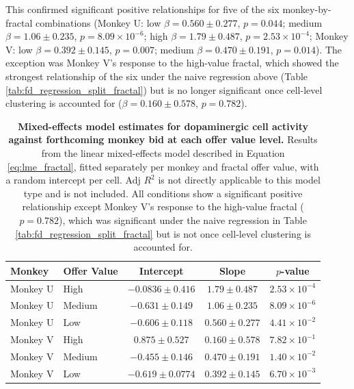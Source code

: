 This confirmed significant positive relationships for five of the six monkey-by-fractal combinations (Monkey U: low $\beta = 0.560 \pm 0.277$, $p = 0.044$; medium $\beta = 1.06 \pm 0.235$, $p = 8.09 \times 10^{-6}$; high $\beta = 1.79 \pm 0.487$, $p = 2.53 \times 10^{-4}$; Monkey V: low $\beta = 0.392 \pm 0.145$, $p = 0.007$; medium $\beta = 0.470 \pm 0.191$, $p = 0.014$). The exception was Monkey V's response to the high-value fractal, which showed the strongest relationship of the six under the naive regression above (Table \ref{tab:fd_regression_split_fractal}) but is no longer significant once cell-level clustering is accounted for ($\beta = 0.160 \pm 0.578$, $p = 0.782$).

\begin{table}[htbp]
\centering
\begin{tabular}{llccc}
\hline
\textbf{Monkey }& \textbf{Offer Value} & \textbf{Intercept} & \textbf{Slope} & $p$\textbf{-value} \\
\hline
Monkey U & High & $-0.0836 \pm 0.416$ & $1.79 \pm 0.487$ & $2.53 \times 10^{-4}$ \\
Monkey U & Medium & $-0.631 \pm 0.149$ & $1.06 \pm 0.235$ & $8.09 \times 10^{-6}$ \\
Monkey U & Low & $-0.606 \pm 0.118$ & $0.560 \pm 0.277$ & $4.41 \times 10^{-2}$ \\
\hline
Monkey V & High & $0.875 \pm 0.527$ & $0.160 \pm 0.578$ & $7.82 \times 10^{-1}$ \\
Monkey V & Medium & $-0.455 \pm 0.146$ & $0.470 \pm 0.191$ & $1.40 \times 10^{-2}$ \\
Monkey V & Low & $-0.619 \pm 0.0774$ & $0.392 \pm 0.145$ & $6.70 \times 10^{-3}$ \\
\hline
\end{tabular}
\caption[Mixed-effects model estimates for dopaminergic cell activity against forthcoming monkey bid at each offer value level.]{\textbf{Mixed-effects model estimates for dopaminergic cell activity against forthcoming monkey bid at each offer value level.} Results from the linear mixed-effects model described in Equation \ref{eq:lme_fractal}, fitted separately per monkey and fractal offer value, with a random intercept per cell. Adj $R^2$ is not directly applicable to this model type and is not included. All conditions show a significant positive relationship except Monkey V's response to the high-value fractal ($p = 0.782$), which was significant under the naive regression in Table \ref{tab:fd_regression_split_fractal} but is not once cell-level clustering is accounted for.}
\label{tab:lme_regression_split_fractal}
\end{table}


